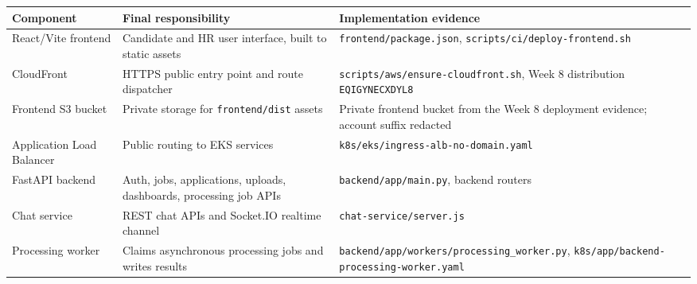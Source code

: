 {
\begingroup
\small
\setlength{\tabcolsep}{3pt}
\renewcommand{\arraystretch}{1.15}
\begin{longtable}{@{}
  >{\raggedright\arraybackslash}p{}
  >{\raggedright\arraybackslash}p{}
  >{\raggedright\arraybackslash}p{}@{}}
\toprule\noalign{}
\begin{minipage}[b]{\linewidth}\raggedright
Component
\end{minipage} & \begin{minipage}[b]{\linewidth}\raggedright
Final responsibility
\end{minipage} & \begin{minipage}[b]{\linewidth}\raggedright
Implementation evidence
\end{minipage} \\
\midrule\noalign{}
\endhead
\bottomrule\noalign{}
\endlastfoot
React/Vite frontend & Candidate and HR user interface, built to static
assets & \texttt{frontend/\allowbreak{}package.\allowbreak{}json},
\texttt{scripts/\allowbreak{}ci/\allowbreak{}deploy-\allowbreak{}frontend.\allowbreak{}sh} \\
CloudFront & HTTPS public entry point and route dispatcher &
\texttt{scripts/\allowbreak{}aws/\allowbreak{}ensure-\allowbreak{}cloudfront.\allowbreak{}sh}, Week 8 distribution
\texttt{EQIGYNECXDYL8} \\
Frontend S3 bucket & Private storage for \texttt{frontend/\allowbreak{}dist} assets &
Private frontend bucket from the Week 8 deployment evidence; account
suffix redacted \\
Application Load Balancer & Public routing to EKS services &
\texttt{k8s/\allowbreak{}eks/\allowbreak{}ingress-\allowbreak{}alb-\allowbreak{}no-\allowbreak{}domain.\allowbreak{}yaml} \\
FastAPI backend & Auth, jobs, applications, uploads, dashboards,
processing job APIs & \texttt{backend/\allowbreak{}app/\allowbreak{}main.\allowbreak{}py}, backend routers \\
Chat service & REST chat APIs and Socket.IO realtime channel &
\texttt{chat-\allowbreak{}service/\allowbreak{}server.\allowbreak{}js} \\
Processing worker & Claims asynchronous processing jobs and writes
results & \texttt{backend/\allowbreak{}app/\allowbreak{}workers/\allowbreak{}processing\_\allowbreak{}worker.\allowbreak{}py},
\texttt{k8s/\allowbreak{}app/\allowbreak{}backend-\allowbreak{}processing-\allowbreak{}worker.\allowbreak{}yaml} \\

\end{longtable}}
